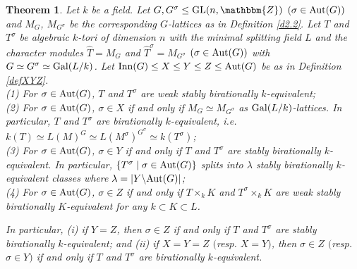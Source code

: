 \documentclass{amsart}
\theoremstyle{plain}
\newtheorem{theorem}{Theorem}[section]
\theoremstyle{definition}
\theoremstyle{remark}
\newcommand{\bZ}{\mathbbm{Z}}\newcommand{\bQ}{\mathbbm{Q}}
\newcommand{\GL}{{\rm GL}}\newcommand{\SL}{{\rm SL}}
\newcounter{sub}\def\tr{\mbox{tr }}
\begin{document}
\begin{theorem}\label{thmXYZ}
Let $k$ be a field. 
Let $G, G^\sigma\leq {\rm GL}(n,\bZ)$ $(\sigma\in {\rm Aut}(G))$ 
and $M_G$, $M_{G^\sigma}$ be the corresponding $G$-lattices 
as in Definition \ref{d2.2}. 
Let $T$ and $T^\sigma$ be algebraic $k$-tori of dimension $n$ 
with the minimal splitting field $L$ and the character modules 
$\widehat{T}=M_G$ and $\widehat{T}^\sigma=M_{G^\sigma}$ 
$(\sigma\in {\rm Aut}(G))$
with 
$G\simeq G^\sigma\simeq {\rm Gal}(L/k)$. 
Let ${\rm Inn}(G)\leq X\leq Y\leq Z\leq {\rm Aut}(G)$ 
be as in Definition \ref{defXYZ}.\\
{\rm (1)} For $\sigma\in {\rm Aut}(G)$, 
$T$ and $T^\sigma$ are weak stably birationally $k$-equivalent;\\
{\rm (2)} For $\sigma\in {\rm Aut}(G)$, 
$\sigma\in X$ if and only if 
$M_G\simeq M_{G^\sigma}$ as ${\rm Gal}(L/k)$-lattices. 
In particular,  
$T$ and $T^\sigma$ are birationally $k$-equivalent, i.e. 
$k(T)\simeq L(M)^G\simeq L(M^\sigma)^{G^\sigma}\simeq k(T^\sigma)$;\\
{\rm (3)} For $\sigma\in {\rm Aut}(G)$, 
$\sigma\in Y$ if and only if 
$T$ and $T^\sigma$ are stably birationally $k$-equivalent. 
In particular, 
$\{T^\sigma\mid \sigma\in {\rm Aut}(G)\}$ splits into 
$\lambda$ stably birationally $k$-equivalent classes 
where 
$\lambda=|Y\backslash {\rm Aut}(G)|$;\\ %
{\rm (4)} For $\sigma\in {\rm Aut}(G)$, 
$\sigma\in Z$ if and only if 
$T\times_k K$ and $T^\sigma\times_k K$ 
are weak stably birationally $K$-equivalent for any $k\subset K\subset L$. 

In particular, {\rm (i)} if $Y=Z$, then 
$\sigma \in Z$ 
if and only if 
$T$ and $T^\sigma$ are stably birationally $k$-equivalent; 
and {\rm (ii)} if $X=Y=Z$ $($resp. $X=Y$$)$, then 
$\sigma\in Z$ $($resp. $\sigma\in Y$$)$
if and only if 
$T$ and $T^\sigma$ are birationally $k$-equivalent. 
\end{theorem}
%
\end{document}
